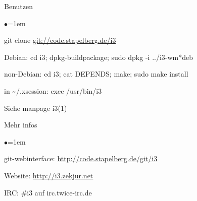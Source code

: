 \documentclass[mode=print,paper=screen,style=jefka]{powerdot}
\begin{document}
\begin{slide}{Benutzen}
\begin{list}{$\bullet$}{\itemsep=1em}
	\item git clone \url{git://code.stapelberg.de/i3}
	\item Debian: cd i3; dpkg-buildpackage; sudo dpkg -i ../i3-wm*deb
	\item non-Debian: cd i3; cat DEPENDS; make; sudo make install
	\item in \~{}/.xsession: exec /usr/bin/i3
	\item Siehe manpage i3(1)
\end{list}
\end{slide}

\begin{slide}{Mehr infos}
\begin{list}{$\bullet$}{\itemsep=1em}
	\item git-webinterface: \url{http://code.stapelberg.de/git/i3}
	\item Website: \url{http://i3.zekjur.net}
	\item IRC: \#i3 auf irc.twice-irc.de
\end{list}
\end{slide}
\end{document}
